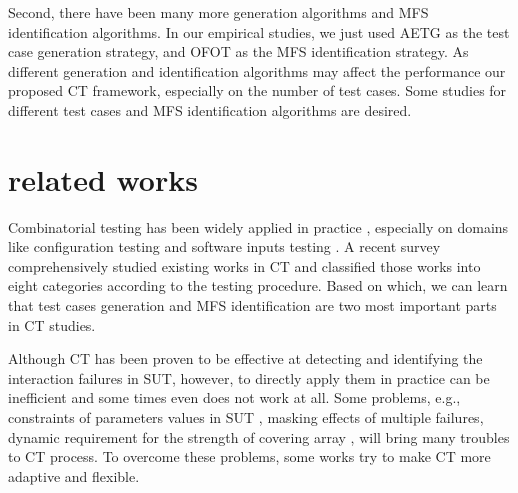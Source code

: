 \documentclass{sig-alternate}
\begin{document}
Second, there have been many more generation algorithms and MFS identification algorithms. In our empirical studies, we just used AETG \cite{cohen1997aetg} as the test case generation strategy, and OFOT \cite{nie2011minimal} as the MFS identification strategy. As different generation and identification algorithms may affect the performance our proposed CT framework, especially on the number of test cases.
Some studies for different test cases and MFS identification algorithms are desired.



\section{related works}
Combinatorial testing has been widely applied in practice \cite{kuhn2010practical}, especially on domains like configuration testing \cite{yilmaz2006covering,cohen2006testing,qu2008configuration,fouche2009incremental} and software inputs testing \cite{cohen1997aetg,borazjany2012combinatorial,ghandehari2013applying,garn2014eris}. A recent survey \cite{nie2011survey} comprehensively studied existing works in CT and classified those works into eight categories according to the testing procedure. Based on which, we can learn that test cases generation and MFS identification are two most important parts in CT studies.

Although CT has been proven to be effective at detecting and identifying the interaction failures in SUT, however, to directly apply them in practice can be inefficient and some times even does not work at all. Some problems, e.g., constraints of parameters values in SUT \cite{cohen2007exploiting,cohen2008constructing}, masking effects of multiple failures\cite{dumlu2011feedback,yilmaz2013reducing}, dynamic requirement for the strength of covering array \cite{fouche2009incremental}, will bring many troubles to CT process. To overcome these problems, some works try to make CT more adaptive and flexible.
\end{document}
